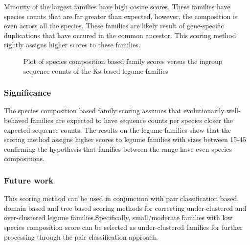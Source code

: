 \documentclass{article}
\begin{document}
		Minority of the largest families have high cosine scores.  These families have species counts that are far greater than expected, however, the composition is even across all the species. These families are likely result of gene-specific duplications that have occured in the common ancestor. This scoring method rightly assigns higher scores to these families.
		
		\begin{figure}[h!]
			\caption{Plot of species composition based family scores versus the ingroup sequence counts of the Ks-based legume families}
			\label{fig:scatter_famsize_vs_species_comp_cosine_score}
		\end{figure}
		
		\subsubsection{Significance}
		The species composition based family scoring assumes that evolutionarily well-behaved families are expected to have sequence counts per species closer the expected sequence counts. The results on the legume families show that the scoring method assigns higher scores to legume families with sizes between 15-45 confirming the hypothesis that families between the range have even species compositions.
	
		\subsubsection{Future work}
		This scoring method can be used in conjunction with pair classification based, domain based and tree based scoring methods for correcting under-clustered and over-clustered legume families.Specifically, small/moderate families with low species composition score can be selected as under-clustered families for further processing through the pair classification approach.
		
\end{document}
